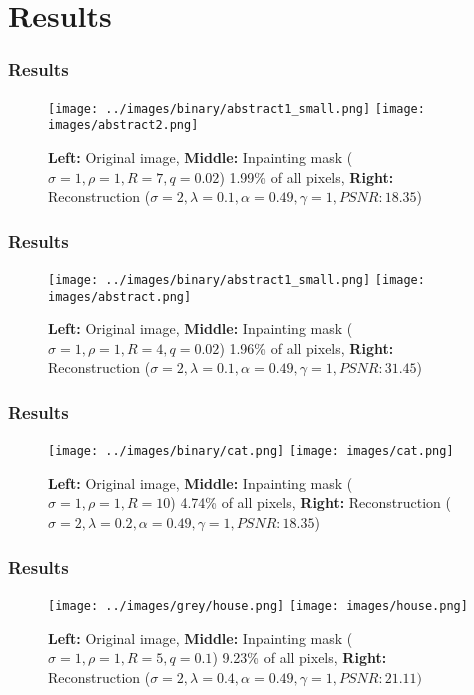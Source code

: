 \documentclass{beamer}
\begin{document}
    \section{Results}
    \begin{frame}
        \frametitle{Results}
        \begin{figure}[htpb]
            \centering
            \texttt{[image: ../images/binary/abstract1\_small.png]}
            \texttt{[image: images/abstract2.png]}
            \caption{ \textbf{Left:} Original image, \textbf{Middle:} Inpainting mask
                ($\sigma=1,\rho=1,R=7,q=0.02$) 1.99\% of all pixels, \textbf{Right:} Reconstruction
            ($\sigma=2,\lambda=0.1,\alpha=0.49,\gamma=1, PSNR: 18.35$) }
        \end{figure}
    \end{frame}

    \begin{frame}
        \frametitle{Results}
        \begin{figure}[htpb]
            \centering
            \texttt{[image: ../images/binary/abstract1\_small.png]}
            \texttt{[image: images/abstract.png]}
            \caption{ \textbf{Left:} Original image, \textbf{Middle:} Inpainting mask
                ($\sigma=1,\rho=1,R=4,q=0.02$) 1.96\% of all pixels, \textbf{Right:} Reconstruction
            ($\sigma=2,\lambda=0.1,\alpha=0.49,\gamma=1, PSNR: 31.45$) }
        \end{figure}
    \end{frame}

    \begin{frame}
        \frametitle{Results}
        \begin{figure}[htpb]
            \centering
            \texttt{[image: ../images/binary/cat.png]}
            \texttt{[image: images/cat.png]}
            \caption{ \textbf{Left:} Original image, \textbf{Middle:} Inpainting mask
                ($\sigma=1,\rho=1,R=10$) 4.74\% of all pixels, \textbf{Right:} Reconstruction
            ($\sigma=2,\lambda=0.2,\alpha=0.49,\gamma=1, PSNR: 18.35$) }
        \end{figure}
    \end{frame}

    \begin{frame}
        \frametitle{Results}
        \begin{figure}[htpb]
            \centering
            \texttt{[image: ../images/grey/house.png]}
            \texttt{[image: images/house.png]}
            \caption{ \textbf{Left:} Original image, \textbf{Middle:} Inpainting mask ($\sigma=1,
            \rho=1, R=5, q=0.1$) 9.23\% of all pixels, \textbf{Right:} Reconstruction
            ($\sigma=2,\lambda=0.4,\alpha=0.49,\gamma=1, PSNR: 21.11)$}
        \end{figure}
    \end{frame}
\end{document}
